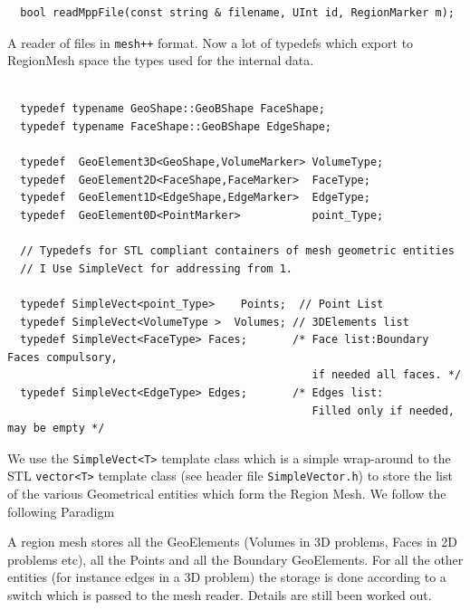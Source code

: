 \begin{verbatim}
  bool readMppFile(const string & filename, UInt id, RegionMarker m);
\end{verbatim}
A reader of files in \texttt{mesh++} format.  Now a lot of typedefs
which export to RegionMesh space the types used for the internal data.
\begin{verbatim}

  typedef typename GeoShape::GeoBShape FaceShape;
  typedef typename FaceShape::GeoBShape EdgeShape;
  
  typedef  GeoElement3D<GeoShape,VolumeMarker> VolumeType;
  typedef  GeoElement2D<FaceShape,FaceMarker>  FaceType;
  typedef  GeoElement1D<EdgeShape,EdgeMarker>  EdgeType;
  typedef  GeoElement0D<PointMarker>           point_Type; 

  // Typedefs for STL compliant containers of mesh geometric entities
  // I Use SimpleVect for addressing from 1.

  typedef SimpleVect<point_Type>    Points;  // Point List
  typedef SimpleVect<VolumeType >  Volumes; // 3DElements list
  typedef SimpleVect<FaceType> Faces;       /* Face list:Boundary Faces compulsory,
                                               if needed all faces. */
  typedef SimpleVect<EdgeType> Edges;       /* Edges list:
                                               Filled only if needed, may be empty */
\end{verbatim}  
We use the \texttt{SimpleVect<T>} template class which is a simple
wrap-around to the STL \texttt{vector<T>} template class (see header file
\texttt{SimpleVector.h}) to store the list of the various 
Geometrical entities which form the Region Mesh. We follow the following Paradigm
\begin{description}
\item A region mesh stores all the GeoElements (Volumes in 3D
  problems, Faces in 2D problems etc), all the Points and all the
  Boundary GeoElements. For all the other entities (for instance edges
  in a 3D problem) the storage is done according to a switch which is
  passed to the mesh reader.  Details are still been worked out.
\end{description}

